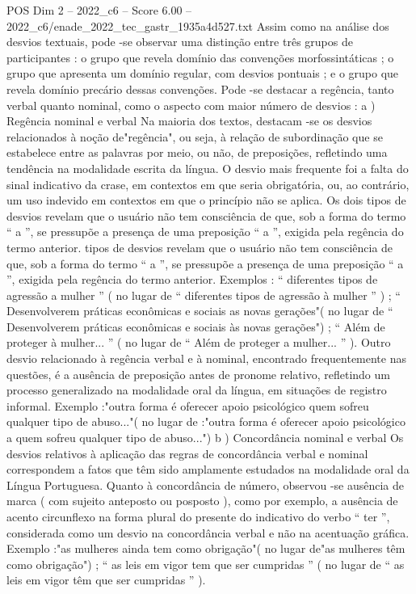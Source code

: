 \begin{textsample}{POS Dim 2 – 2022\_c6 – Score 6.00 – 2022\_c6/enade\_2022\_tec\_gastr\_1935a4d527.txt}
Assim como na análise dos desvios textuais, pode -se observar uma distinção entre três grupos de participantes : o grupo que revela domínio das convenções morfossintáticas ; o grupo que apresenta um domínio regular, com desvios pontuais ; e o grupo que revela domínio precário dessas convenções.
Pode -se destacar a regência, tanto verbal quanto nominal, como o aspecto com maior número de desvios : a ) Regência nominal e verbal Na maioria dos textos, destacam -se os desvios relacionados à noção de"regência", ou seja, à relação de subordinação que se estabelece entre as palavras por meio, ou não, de preposições, refletindo uma tendência na modalidade escrita da língua.
O desvio mais frequente foi a falta do sinal indicativo da crase, em contextos em que seria obrigatória, ou, ao contrário, um uso indevido em contextos em que o princípio não se aplica.
Os dois tipos de desvios revelam que o usuário não tem consciência de que, sob a forma do termo “ a ”, se pressupõe a presença de uma preposição “ a ”, exigida pela regência do termo anterior. tipos de desvios revelam que o usuário não tem consciência de que, sob a forma do termo “ a ”, se pressupõe a presença de uma preposição “ a ”, exigida pela regência do termo anterior.
Exemplos : “ diferentes tipos de agressão a mulher ” ( no lugar de “ diferentes tipos de agressão à mulher ” ) ; “ Desenvolverem práticas econômicas e sociais as novas gerações"( no lugar de “ Desenvolverem práticas econômicas e sociais às novas gerações") ; “ Além de proteger à mulher... ” ( no lugar de “ Além de proteger a mulher... ” ).
Outro desvio relacionado à regência verbal e à nominal, encontrado frequentemente nas questões, é a ausência de preposição antes de pronome relativo, refletindo um processo generalizado na modalidade oral da língua, em situações de registro informal.
Exemplo :"outra forma é oferecer apoio psicológico quem sofreu qualquer tipo de abuso..."( no lugar de :"outra forma é oferecer apoio psicológico a quem sofreu qualquer tipo de abuso...") b ) Concordância nominal e verbal Os desvios relativos à aplicação das regras de concordância verbal e nominal correspondem a fatos que têm sido amplamente estudados na modalidade oral da Língua Portuguesa.
Quanto à concordância de número, observou -se ausência de marca ( com sujeito anteposto ou posposto ), como por exemplo, a ausência de acento circunflexo na forma plural do presente do indicativo do verbo “ ter ”, considerada como um desvio na concordância verbal e não na acentuação gráfica.
Exemplo :"as mulheres ainda tem como obrigação"( no lugar de"as mulheres têm como obrigação") ; “ as leis em vigor tem que ser cumpridas ” ( no lugar de “ as leis em vigor têm que ser cumpridas ” ).

\end{textsample}
